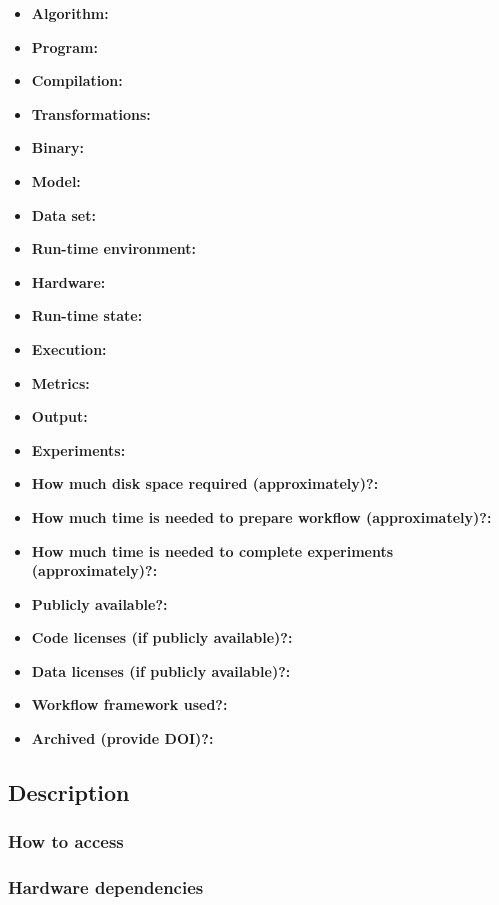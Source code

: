\documentclass[sigconf,10pt, screen]{acmart}
\begin{document}
{\small
\begin{itemize}
  \item {\bf Algorithm: }
  \item {\bf Program: }
  \item {\bf Compilation: }
  \item {\bf Transformations: }
  \item {\bf Binary: }
  \item {\bf Model: }
  \item {\bf Data set: }
  \item {\bf Run-time environment: }
  \item {\bf Hardware: }
  \item {\bf Run-time state: }
  \item {\bf Execution: }
  \item {\bf Metrics: }
  \item {\bf Output: }
  \item {\bf Experiments: }
  \item {\bf How much disk space required (approximately)?: }
  \item {\bf How much time is needed to prepare workflow (approximately)?: }
  \item {\bf How much time is needed to complete experiments (approximately)?: }
  \item {\bf Publicly available?: }
  \item {\bf Code licenses (if publicly available)?: }
  \item {\bf Data licenses (if publicly available)?: }
  \item {\bf Workflow framework used?: }
  \item {\bf Archived (provide DOI)?: }
\end{itemize}
}

\subsection{Description}

\subsubsection{How to access}

\subsubsection{Hardware dependencies}
\end{document}
